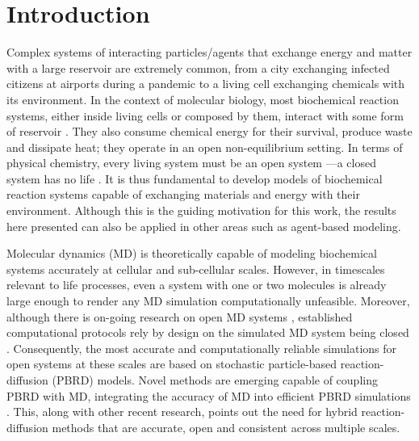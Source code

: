 \documentclass[10pt,twocolumn]{revtex4-1}
\begin{document}
	
	\section{Introduction}
	
	
	Complex systems of interacting particles/agents that exchange energy and matter with a large reservoir are extremely common, from a city exchanging infected citizens at airports during a pandemic to a living cell exchanging chemicals with its environment. In the context of molecular biology, most biochemical reaction systems, either inside living cells or composed by them, interact with some form of reservoir \cite{qian2007phosphorylation}.	They also consume chemical energy for their survival, produce waste and dissipate heat; they operate in an open non-equilibrium setting. In terms of physical chemistry, every living system must be an open system —a closed system has no life \cite{qian2007phosphorylation}. It is thus fundamental to develop models of biochemical reaction systems capable of exchanging materials and energy with their environment. Although this is the guiding motivation for this work, the results here presented can also be applied in other areas such as agent-based modeling.
	
	Molecular dynamics (MD) is theoretically capable of modeling biochemical systems accurately at cellular and sub-cellular scales. However, in timescales relevant to life processes, even a system with one or two molecules is already large enough to render any MD simulation computationally unfeasible. Moreover, although there is on-going research on open MD systems \cite{agarwal2015molecular, delle2019liouville, delle2019molecular}, established computational protocols rely by design on the simulated MD system being closed \cite{delle2019liouville}. Consequently, the most accurate and computationally reliable simulations for open systems at these scales are based on stochastic particle-based reaction-diffusion (PBRD) models. Novel methods are emerging capable of coupling PBRD with MD, integrating the accuracy of MD into efficient PBRD simulations \cite{dibak2018msm, sbailo2017efficient, vijaykumar2015combining}. This, along with other recent research, points out the need for hybrid reaction-diffusion methods that are accurate, open and consistent across multiple scales. 
	
\end{document}
